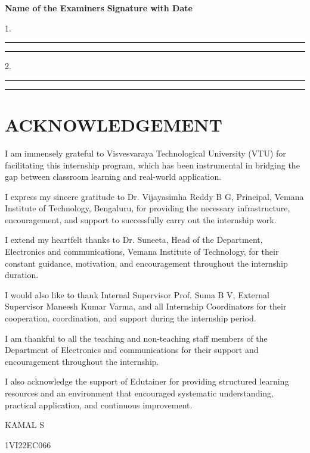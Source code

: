 \documentclass[12pt,a4paper]{report}
\begin{document}
\vspace{0.8cm}
\textbf{Name of the Examiners} \hfill \textbf{Signature with Date}\par
\vspace{0.3cm}
1.\enspace\rule{5cm}{0.4pt} \hfill \rule{3.5cm}{0.4pt}\par
\vspace{0.5cm}
2.\enspace\rule{5cm}{0.4pt} \hfill \rule{3.5cm}{0.4pt}\par



\newpage
\chapter*{ACKNOWLEDGEMENT}

I am immensely grateful to Visvesvaraya Technological University (VTU) for facilitating this internship program, which has been instrumental in bridging the gap between classroom learning and real-world application.

I express my sincere gratitude to Dr. Vijayasimha Reddy B G, Principal, Vemana Institute of Technology, Bengaluru, for providing the necessary infrastructure, encouragement, and support to successfully carry out the internship work.

I extend my heartfelt thanks to Dr. Suneeta, Head of the Department, Electronics and communications, Vemana Institute of Technology, for their constant guidance, motivation, and encouragement throughout the internship duration.

I would also like to thank Internal Supervisor Prof. Suma B V, External Supervisor Maneesh Kumar Varma, and all Internship Coordinators for their cooperation, coordination, and support during the internship period.

I am thankful to all the teaching and non-teaching staff members of the Department of Electronics and communications for their support and encouragement throughout the internship.

I also acknowledge the support of Edutainer for providing structured learning resources and an environment that encouraged systematic understanding, practical application, and continuous improvement.

\vspace{0.5cm}
KAMAL S\par
1VI22EC066\par
\end{document}
